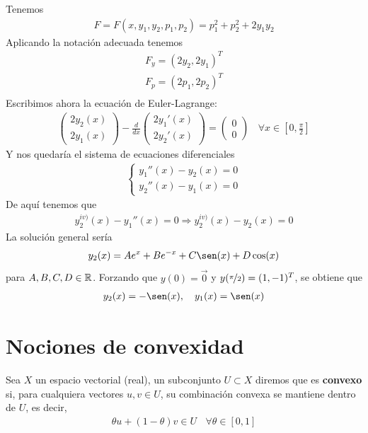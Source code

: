 Tenemos
\begin{gather*}
    F = F(x,y_1,y_2,p_1,p_2) = p_1^2 + p_2^2 + 2y_1y_2
\end{gather*}
Aplicando la notación adecuada tenemos 
\begin{gather*}
    F_y = (2y_2, 2y_1)^T\\
    F_p = (2p_1, 2p_2)^T\\
\end{gather*}
Escribimos ahora la ecuación de Euler-Lagrange:
\begin{gather*}
    \begin{pmatrix}
        2y_2(x)\\
        2y_1(x)
    \end{pmatrix}
    - \frac{d}{dx}
    \begin{pmatrix}
        2y_1'(x)\\
        2y_2'(x)
    \end{pmatrix} = 
    \begin{pmatrix}
        0 \\
        0
    \end{pmatrix}
    \ \ \ \ \forall x \in \left[0, \frac{\pi}{2}\right]
\end{gather*}
Y nos quedaría el sistema de ecuaciones diferenciales
\begin{gather*}
    \left\{
        \begin{array}{l}
            y_1''(x) - y_2(x) = 0\\
            y_2''(x) - y_1(x) = 0
        \end{array}
    \right.
\end{gather*}
De aquí tenemos que 
\begin{gather*}
    y_2^{iv)} (x) - y_1''(x) = 0 \Rightarrow y_2^{iv)}(x) -y_2(x) = 0
\end{gather*}
La solución general sería 
\begin{gather*}
    y_2(x) = Ae^x + Be^{-x} + C\sen(x) + D\cos(x)
\end{gather*}
para $A,B,C,D\in \mathbb{R}$. Forzando que $y(0)=\vec{0}$ y $y(\nicefrac{\pi}{2}) = (1,-1)^T$, se obtiene que 
\begin{gather*}
    y_2(x) = -\sen(x),\ \ \ y_1(x) = \sen(x)
\end{gather*}

\section{Nociones de convexidad}
\begin{definicion}
    Sea $X$ un espacio vectorial (real), un subconjunto $U\subset X$ diremos que es \textbf{convexo} si, para cualquiera vectores $u,v\in U$, su combinación convexa se mantiene dentro de $U$, es decir,
    \begin{gather*}
        \theta u + (1-\theta)v\in U \ \ \ \ \forall \theta \in [0,1]
    \end{gather*}
\end{definicion}

